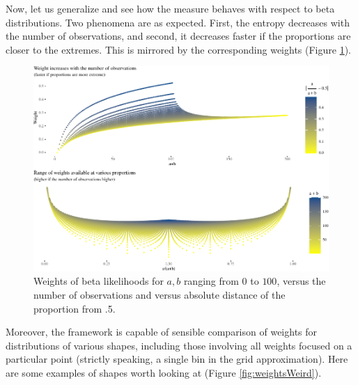 \documentclass[
  10pt,
  dvipsnames,enabledeprecatedfontcommands]{scrartcl}
\begin{document}

Now, let us generalize and see how the measure behaves with respect to
beta distributions. Two phenomena are as expected. First, the entropy
decreases with the number of observations, and second, it decreases
faster if the proportions are closer to the extremes. This is mirrored
by the corresponding weights (Figure \ref{fig:weights}).

\begin{figure}[H]

\begin{center}\includegraphics[width=1\linewidth]{imprecision_weight_files/figure-latex/fig:weights-1} \end{center}
\caption{Weights of beta likelihoods for $a,b$ ranging from $0$ to $100$, versus the number of observations   and versus absolute distance of the proportion from .5.}
\label{fig:weights}
\end{figure}

Moreover, the framework is capable of sensible comparison of weights for
distributions of various shapes, including those involving all weights
focused on a particular point (strictly speaking, a single bin in the
grid approximation). Here are some examples of shapes worth looking at
(Figure \ref{fig:weightsWeird}).
\end{document}
